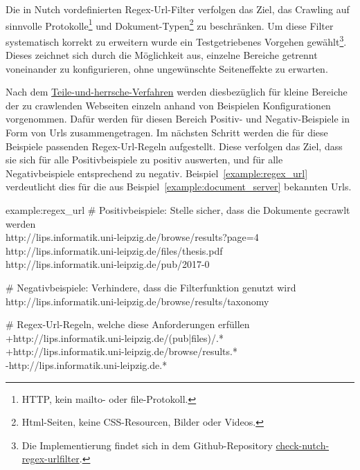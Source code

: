Die in Nutch vordefinierten Regex-Url-Filter verfolgen das Ziel,
das Crawling auf sinnvolle Protokolle\footnote{HTTP, kein mailto- oder file-Protokoll.}
und Dokument-Typen\footnote{Html-Seiten, keine CSS-Resourcen, Bilder oder Videos.} zu beschränken.
Um diese Filter systematisch korrekt zu erweitern wurde ein
Testgetriebenes Vorgehen gewählt\footnote{Die Implementierung findet
sich in dem Github-Repository \href{https://github.com/mam10eks/check-nutch-regex-urlfilter}{check-nutch-regex-urlfilter}.}.
Dieses zeichnet sich durch die Möglichkeit aus, einzelne Bereiche getrennt voneinander zu konfigurieren, ohne ungewünschte Seiteneffekte zu erwarten.

Nach dem \href{https://de.wikipedia.org/wiki/Teile-und-herrsche-Verfahren}{Teile-und-herrsche-Verfahren} werden
diesbezüglich für kleine Bereiche der zu crawlenden Webseiten einzeln anhand von Beispielen Konfigurationen vorgenommen.
Dafür werden für diesen Bereich Positiv- und Negativ-Beispiele in Form von Urls zusammengetragen.
Im nächsten Schritt werden die für diese Beispiele passenden Regex-Url-Regeln aufgestellt.
Diese verfolgen das Ziel, dass sie sich für alle Positivbeispiele zu positiv auswerten, und für alle Negativbeispiele entsprechend zu negativ.
Beispiel~\ref{example:regex_url} verdeutlicht dies für die aus Beispiel~\ref{example:document_server} bekannten Urls.

\begin{example}{example:regex_url}
\# Positivbeispiele: Stelle sicher, dass die Dokumente gecrawlt werden\\
http://lips.informatik.uni-leipzig.de/browse/results?page=4\\
http://lips.informatik.uni-leipzig.de/files/thesis.pdf\\
http://lips.informatik.uni-leipzig.de/pub/2017-0

\# Negativbeispiele: Verhindere, dass die Filterfunktion genutzt wird\\
http://lips.informatik.uni-leipzig.de/browse/results/taxonomy%

\# Regex-Url-Regeln, welche diese Anforderungen erfüllen\\
+http://lips.informatik.uni-leipzig.de/(pub|files)/.*\\
+http://lips.informatik.uni-leipzig.de/browse/results.*\\
-http://lips.informatik.uni-leipzig.de.*\\
\end{example}

